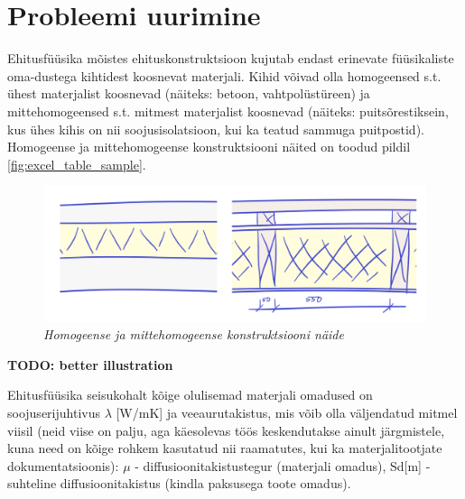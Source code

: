 \section{Probleemi uurimine}

Ehitusfüüsika mõistes ehituskonstruktsioon kujutab endast erinevate füüsikaliste oma-dustega kihtidest 
koosnevat materjali. Kihid võivad olla homogeensed s.t. ühest materjalist koosnevad (näiteks: betoon, vahtpolüstüreen) ja
mittehomogeensed s.t. mitmest materjalist koosnevad (näiteks: puitsõrestiksein, kus ühes kihis on nii soojusisolatsioon, 
kui ka teatud sammuga puitpostid). Homogeense ja mittehomogeense konstruktsiooni näited on toodud pildil \ref{fig:excel_table_sample}.

\begin{figure}[ht]
    \centering
    \includegraphics[width=.8\textwidth]{figures/01_analogues/06_un_non_unif_sample.png}
    \caption{\textit{Homogeense ja mittehomogeense konstruktsiooni näide}}
    \label{fig:construction_samples}
\end{figure}
\textbf{TODO: better illustration}

Ehitusfüüsika seisukohalt kõige olulisemad materjali omadused on soojuserijuhtivus \begin{math}\lambda\end{math} [W/mK]
ja veeaurutakistus, mis võib olla väljendatud mitmel viisil (neid viise on palju, aga käesolevas töös keskendutakse 
ainult järgmistele, kuna need on kõige rohkem kasutatud nii raamatutes, kui ka materjalitootjate dokumentatsioonis):
\begin{math}\mu\end{math} - diffusioonitakistustegur (materjali omadus), Sd[m] - suhteline diffusioonitakistus (kindla paksusega toote omadus).


